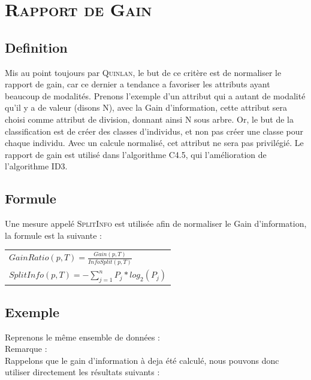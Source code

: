 \documentclass[a4paper, 11pt]{report}
\begin{document}
\chapter{\textsc{Rapport de Gain}}

\section{Definition}
Mis au point toujours par \textsc{Quinlan}, le but de ce critère est de normaliser le rapport de gain, car ce dernier a tendance a favoriser les attributs ayant beaucoup de modalités.
Prenons l'exemple d'un attribut qui a autant de modalité qu'il y a de valeur (disons N), avec la Gain d'information, cette attribut sera choisi comme attribut de division, donnant ainsi N sous arbre. Or, le but de la classification est de créer des classes d'individus, et non pas créer une classe pour chaque individu. Avec un calcule normalisé, cet attribut ne sera pas privilégié.
Le rapport de gain est utilisé dans l'algorithme C4.5, qui l'amélioration de l'algorithme ID3.
\section{Formule}
Une mesure appelé \textsc{SplitInfo} est utilisée afin de normaliser le Gain d'information, la formule est la suivante : 
\begin{center}
\begin{tabular}{| l |}
\hline
$GainRatio(p,T) = \frac{Gain(p,T)}{InfoSplit(p,T)} $\\
$SplitInfo(p,T) = - \sum_{j=1}^n P_j * log_2 (P_j)$\\

\hline
\end{tabular}
\end{center}

\section{Exemple}
Reprenons le même ensemble de données :
\\Remarque :\\
Rappelons que le gain d'information à deja été calculé, nous pouvons donc utiliser directement les résultats suivants  :
\end{document}
